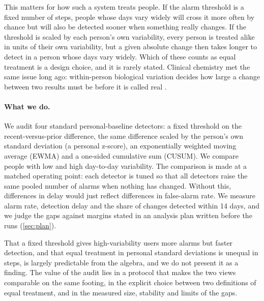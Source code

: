 \documentclass[11pt,a4paper]{article}
\begin{document}
This matters for how such a system treats people.
If the alarm threshold is a fixed number of steps, people whose days vary widely will cross it more often by chance but will also be detected sooner when something really changes.
If the threshold is scaled by each person's own variability, every person is treated alike in units of their own variability, but a given absolute change then takes longer to detect in a person whose days vary widely.
Which of these counts as equal treatment is a design choice, and it is rarely stated.
Clinical chemistry met the same issue long ago: within-person biological variation decides how large a change between two results must be before it is called real \citep{fraser1989}.

\paragraph{What we do.}
We audit four standard personal-baseline detectors: a fixed threshold on the recent-versus-prior difference, the same difference scaled by the person's own standard deviation (a personal z-score), an exponentially weighted moving average (EWMA) and a one-sided cumulative sum (CUSUM).
We compare people with low and high day-to-day variability.
The comparison is made at a matched operating point: each detector is tuned so that all detectors raise the same pooled number of alarms when nothing has changed.
Without this, differences in delay would just reflect differences in false-alarm rate.
We measure alarm rate, detection delay and the share of changes detected within 14 days, and we judge the gaps against margins stated in an analysis plan written before the runs (\cref{sec:plan}).

That a fixed threshold gives high-variability users more alarms but faster detection, and that equal treatment in personal standard deviations is unequal in steps, is largely predictable from the algebra, and we do not present it as a finding.
The value of the audit lies in a protocol that makes the two views comparable on the same footing, in the explicit choice between two definitions of equal treatment, and in the measured size, stability and limits of the gaps.
\end{document}
